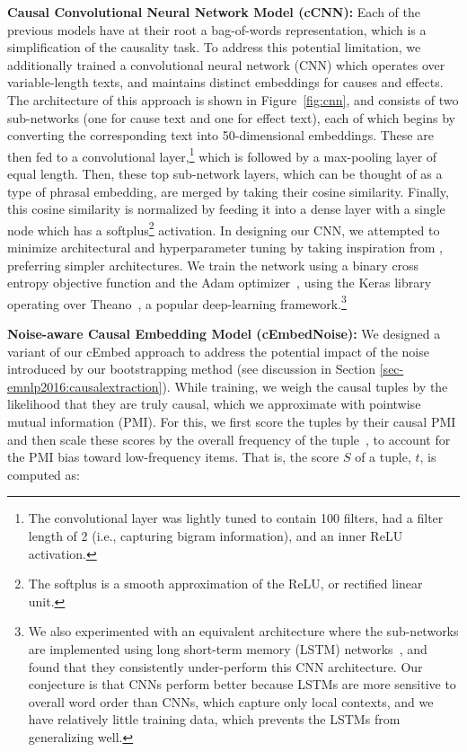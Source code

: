 {\flushleft \textbf{Causal Convolutional Neural Network Model (cCNN):}}
Each of the previous models have at their root a bag-of-words representation, which is a simplification of the causality task. To address this potential limitation, we additionally trained a convolutional neural network (CNN) which operates over variable-length texts, and maintains distinct embeddings for causes and effects.  The architecture of this approach is shown in Figure~\ref{fig:cnn}, and consists of two sub-networks (one for cause text and one for effect text), each of which begins by converting the corresponding text into 50-dimensional embeddings.  These are then fed to a convolutional layer,\footnote{The convolutional layer was lightly tuned to contain 100 filters, had a filter length of 2 (i.e., capturing bigram information), and an inner ReLU activation.} which is followed by a max-pooling layer of equal length.
Then, these top sub-network layers, which can be thought of as a type of phrasal embedding, are merged by taking their cosine similarity.  Finally, this cosine similarity is normalized by feeding it into a dense layer with a single node which has a softplus\footnote{The softplus is a smooth approximation of the ReLU, or rectified linear unit.} activation.  
In designing our CNN, we attempted to minimize architectural and hyperparameter tuning by taking inspiration from \citet{iyyer2015deep}, preferring simpler architectures.
We train the network using a binary cross entropy objective function and the Adam optimizer~\citep{kingma2014adam}, using the Keras library~\citep{chollet2015keras} operating over Theano~\citep{2016arXiv160502688short}, a popular deep-learning framework.\footnote{We also experimented with an equivalent architecture where the sub-networks are implemented using long short-term memory (LSTM) networks~\citep{hochreiter1997long}, and found that they consistently under-perform this CNN architecture. Our conjecture is that CNNs perform better because LSTMs are more sensitive to overall word order than CNNs, which capture only local contexts, and we have relatively little training data, which prevents the LSTMs from generalizing well.}

{\flushleft \textbf{Noise-aware Causal Embedding Model (cEmbedNoise):}} 
We designed a variant of our cEmbed approach to address the potential impact of the noise introduced by our bootstrapping method (see discussion in Section \ref{sec-emnlp2016:causalextraction}).
While training, we weigh the causal tuples by the likelihood that they are truly causal, which we approximate with pointwise mutual information (PMI).
For this, we first score the tuples by their causal PMI and then scale these scores by the overall frequency of the tuple~\citep{riloff1996automatically}, to account for the PMI bias toward low-frequency items.  That is, the score $S$ of a tuple, $t$, is computed as: 

